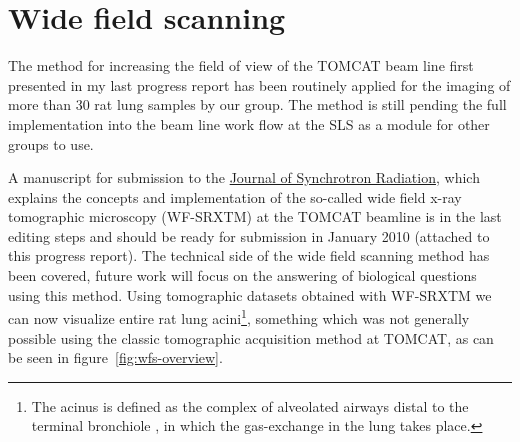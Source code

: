 \documentclass[a4paper,twoside,DIV=calc]{scrartcl}
\newif\ifhtml
\begin{document}
\section{Wide field scanning}\label{sec:wfs}
The method for increasing the field of view of the TOMCAT beam line first presented in my last progress report has been routinely applied for the imaging of more than 30 rat lung samples by our group. The method is still pending the full implementation into the beam line work flow at the SLS as a module for other groups to use.

A manuscript for submission to the \ifhtml Journal of Synchrotron Radiation\else\href{http://journals.iucr.org/s/}{Journal of Synchrotron Radiation}\fi, which explains the concepts and implementation of the so-called wide field x-ray tomographic microscopy (WF-SRXTM) at the TOMCAT beamline is in the last editing steps and should be ready for submission in January 2010 (attached to this progress report). The technical side of the wide field scanning method has been covered, future work will focus on the answering of biological questions using this method. Using tomographic datasets obtained with WF-SRXTM we can now visualize entire rat lung acini\footnote{The acinus is defined as the complex of alveolated airways distal to the terminal bronchiole \cite{Rodriguez1987}, in which the gas-exchange in the lung takes place.}, something which was not generally possible using the classic tomographic acquisition method at TOMCAT, as can be seen in figure~\ref{fig:wfs-overview}.
\end{document}
